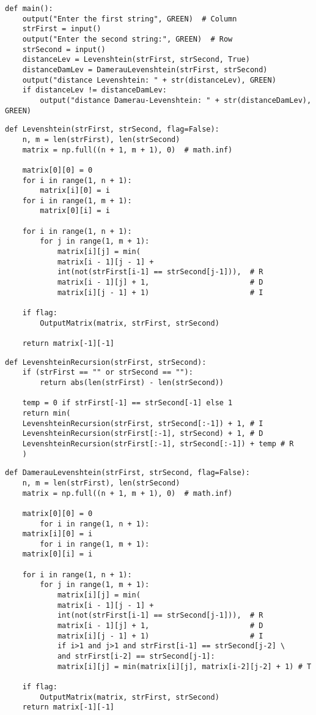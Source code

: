 \begin{lstlisting}[label=some-code,caption=Главная функция main]
def main():
	output("Enter the first string", GREEN)  # Column
	strFirst = input()
	output("Enter the second string:", GREEN)  # Row
	strSecond = input()
	distanceLev = Levenshtein(strFirst, strSecond, True)
	distanceDamLev = DamerauLevenshtein(strFirst, strSecond)
	output("distance Levenshtein: " + str(distanceLev), GREEN)
	if distanceLev != distanceDamLev:
		output("distance Damerau-Levenshtein: " + str(distanceDamLev), GREEN)
\end{lstlisting}

\begin{lstlisting}[label=some-code,caption=Функция нахождения расстояния Левенштейна матрично]
def Levenshtein(strFirst, strSecond, flag=False):
	n, m = len(strFirst), len(strSecond)
	matrix = np.full((n + 1, m + 1), 0)  # math.inf)
	
	matrix[0][0] = 0
	for i in range(1, n + 1):
		matrix[i][0] = i
	for i in range(1, m + 1):
		matrix[0][i] = i
	
	for i in range(1, n + 1):
		for j in range(1, m + 1):
			matrix[i][j] = min(
			matrix[i - 1][j - 1] +
			int(not(strFirst[i-1] == strSecond[j-1])),  # R
			matrix[i - 1][j] + 1,                       # D
			matrix[i][j - 1] + 1)                       # I
		
	if flag:
		OutputMatrix(matrix, strFirst, strSecond)
	
	return matrix[-1][-1]
\end{lstlisting}


\begin{lstlisting}[label=some-code,caption=Рекурсивная функция нахождения расстояния Левенштейна ]
def LevenshteinRecursion(strFirst, strSecond):
	if (strFirst == "" or strSecond == ""):
		return abs(len(strFirst) - len(strSecond))
	
	temp = 0 if strFirst[-1] == strSecond[-1] else 1
	return min(
	LevenshteinRecursion(strFirst, strSecond[:-1]) + 1, # I
	LevenshteinRecursion(strFirst[:-1], strSecond) + 1, # D
	LevenshteinRecursion(strFirst[:-1], strSecond[:-1]) + temp # R
	)
\end{lstlisting}


\begin{lstlisting}[label=some-code,caption=Функция нахождения расстояния Дамерау-Левенштейна матрично]
def DamerauLevenshtein(strFirst, strSecond, flag=False):
	n, m = len(strFirst), len(strSecond)
	matrix = np.full((n + 1, m + 1), 0)  # math.inf)
	
	matrix[0][0] = 0
		for i in range(1, n + 1):
	matrix[i][0] = i
		for i in range(1, m + 1):
	matrix[0][i] = i
	
	for i in range(1, n + 1):
		for j in range(1, m + 1):
			matrix[i][j] = min(
			matrix[i - 1][j - 1] +
			int(not(strFirst[i-1] == strSecond[j-1])),  # R
			matrix[i - 1][j] + 1,                       # D
			matrix[i][j - 1] + 1)                       # I
			if i>1 and j>1 and strFirst[i-1] == strSecond[j-2] \
			and strFirst[i-2] == strSecond[j-1]:
			matrix[i][j] = min(matrix[i][j], matrix[i-2][j-2] + 1) # T
	
	if flag:
		OutputMatrix(matrix, strFirst, strSecond)
	return matrix[-1][-1]
\end{lstlisting}


